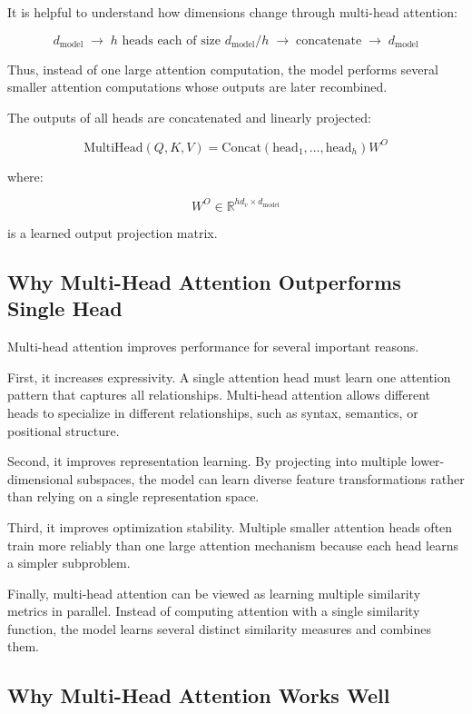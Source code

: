 \documentclass[11pt]{article}
\begin{document}
It is helpful to understand how dimensions change through multi-head attention:

\[
d_{\text{model}}
\;\rightarrow\;
h \text{ heads each of size } d_{\text{model}}/h
\;\rightarrow\;
\text{concatenate}
\;\rightarrow\;
d_{\text{model}}
\]

Thus, instead of one large attention computation, the model performs several smaller attention computations whose outputs are later recombined.

The outputs of all heads are concatenated and linearly projected:

\[
\text{MultiHead}(Q,K,V)
=
\text{Concat}
(
\text{head}_1,
\ldots,
\text{head}_h
)
W^O
\]

where:

\[
W^O \in \mathbb{R}^{h d_v \times d_{\text{model}}}
\]

is a learned output projection matrix.

\subsection{Why Multi-Head Attention Outperforms Single Head}

Multi-head attention improves performance for several important reasons.

First, it increases expressivity. A single attention head must learn one attention pattern that captures all relationships. Multi-head attention allows different heads to specialize in different relationships, such as syntax, semantics, or positional structure.

Second, it improves representation learning. By projecting into multiple lower-dimensional subspaces, the model can learn diverse feature transformations rather than relying on a single representation space.

Third, it improves optimization stability. Multiple smaller attention heads often train more reliably than one large attention mechanism because each head learns a simpler subproblem.

Finally, multi-head attention can be viewed as learning multiple similarity metrics in parallel. Instead of computing attention with a single similarity function, the model learns several distinct similarity measures and combines them.

\subsection{Why Multi-Head Attention Works Well}
\end{document}

